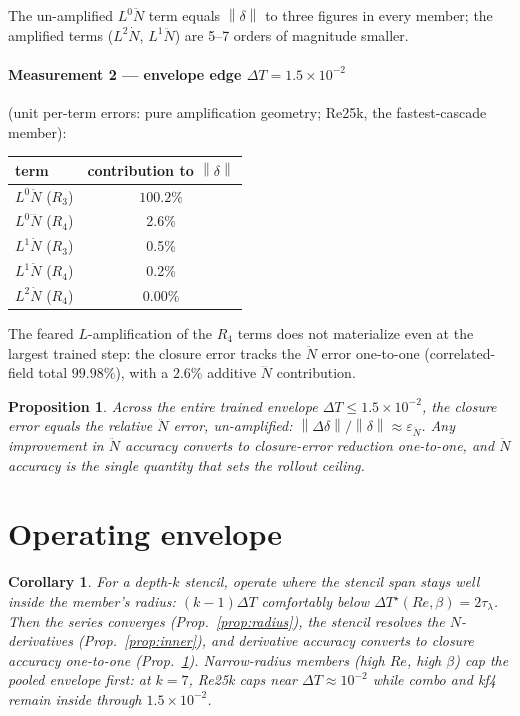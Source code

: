 \documentclass[11pt]{article}
\newtheorem{proposition}{Proposition}
\newtheorem{corollary}{Corollary}
\theoremstyle{remark}
\newcommand{\DT}{\Delta T}
\newcommand{\DTs}{\Delta T^{\star}}
\newcommand{\taul}{\tau_{\lambda}}
\newcommand{\norm}[1]{\left\lVert #1 \right\rVert}
\begin{document}
The un-amplified $L^0\ddot N$ term equals $\norm{\delta}$ to three figures in
every member; the amplified terms ($L^2\dot N$, $L^1\ddot N$) are 5--7
orders of magnitude smaller.

\paragraph{Measurement 2 --- envelope edge $\DT = 1.5\times10^{-2}$}
(unit per-term errors: pure amplification geometry; Re25k, the
fastest-cascade member):

\begin{center}
\begin{tabular}{lc}
\toprule
term & contribution to $\norm{\delta}$\\
\midrule
$L^0\ddot N$ ($R_3$)  & $\mathbf{100.2\%}$\\
$L^0\dddot N$ ($R_4$) & 2.6\%\\
$L^1\dot N$ ($R_3$)   & 0.5\%\\
$L^1\ddot N$ ($R_4$)  & 0.2\%\\
$L^2\dot N$ ($R_4$)   & 0.00\%\\
\bottomrule
\end{tabular}
\end{center}

The feared $L$-amplification of the $R_4$ terms does not materialize even at
the largest trained step: the closure error tracks the $\ddot N$ error
one-to-one (correlated-field total $99.98\%$), with a $2.6\%$ additive
$\dddot N$ contribution.

\begin{proposition}\label{prop:benign}
Across the entire trained envelope $\DT \le 1.5\times10^{-2}$, the closure
error equals the relative $\ddot N$ error, un-amplified:
$\norm{\Delta\delta}/\norm{\delta} \approx \varepsilon_{\ddot N}$. Any
improvement in $\ddot N$ accuracy converts to closure-error reduction
one-to-one, and $\ddot N$ accuracy is the single quantity that sets the
rollout ceiling.
\end{proposition}

\section{Operating envelope}\label{sec:envelope}

\begin{corollary}
For a depth-$k$ stencil, operate where the stencil span stays well inside
the member's radius: $(k{-}1)\DT$ comfortably below
$\DTs(Re,\beta) = 2\taul$. Then the series converges
(Prop.~\ref{prop:radius}), the stencil resolves the $N$-derivatives
(Prop.~\ref{prop:inner}), and derivative accuracy converts to closure
accuracy one-to-one (Prop.~\ref{prop:benign}). Narrow-radius members (high
$Re$, high $\beta$) cap the pooled envelope first: at $k = 7$, Re25k caps
near $\DT \approx 10^{-2}$ while combo and kf4 remain inside through
$1.5\times10^{-2}$.
\end{corollary}
\end{document}
